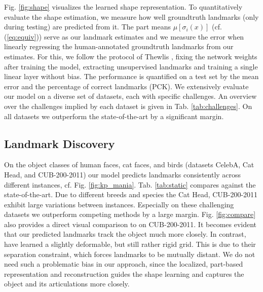 	Fig. \ref{fig:shape} visualizes the learned shape representation.
	To quantitatively evaluate the shape estimation, we measure how well groundtruth landmarks (only during testing) are predicted from it.
	The part means $\mu[\sigma_i(x)]$ (cf. (\ref{eq:equiv})) serve as our landmark estimates and we measure the error when linearly regressing the human-annotated groundtruth landmarks from our estimates.
	For this, we follow the protocol of Thewlis \etal \cite{thewlis17}, fixing the network weights after training the model, extracting unsupervised landmarks and training a single linear layer without bias.
	The performance is quantified on a test set by the mean error and the percentage of correct landmarks (PCK).
	We extensively evaluate our model on a diverse set of datasets, each with specific challenges. An overview over the challenges implied by each dataset is given in Tab. \ref{tab:challenges}.
	On all datasets we outperform the state-of-the-art by a significant margin.


	\subsection{Landmark Discovery}
		On the object classes of human faces, cat faces, and birds (datasets CelebA, Cat Head, and CUB-200-2011) our model predicts landmarks consistently across different instances, cf. Fig. \ref{fig:kp_mania}.
		Tab. \ref{tab:static} compares against the state-of-the-art. Due to different breeds and species the Cat Head, CUB-200-2011 exhibit large variations between instances. Especially on these challenging datasets we outperform competing methods by a large margin.
		Fig. \ref{fig:compare} also provides a direct visual comparison to \cite{zhang18} on CUB-200-2011. It becomes evident that our predicted landmarks track the object much more closely. In contrast, \cite{zhang18} have learned a slightly deformable, but still rather rigid grid.
		This is due to their separation constraint, which forces landmarks to be mutually distant. We do not need such a problematic bias in our approach, since the localized, part-based representation and reconstruction guides the shape learning and captures the object and its articulations more closely.

